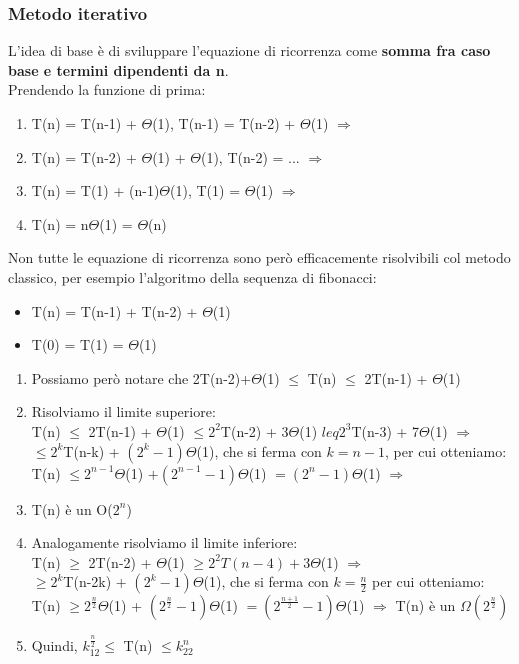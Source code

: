\documentclass{report}
\newcommand{\T}[1]{$\Theta$(#1)}
\begin{document}
        \subsubsection{Metodo iterativo}
            L'idea di base è di sviluppare l'equazione di ricorrenza come \textbf{somma fra caso base e termini dipendenti da n}. \\
            Prendendo la funzione di prima:
            \begin{enumerate}
                \item T(n) = T(n-1) + \T{1}, T(n-1) = T(n-2) + \T{1} $\Longrightarrow$
                \item T(n) = T(n-2) + \T{1} + \T{1}, T(n-2) = ... $\Longrightarrow$
                \item T(n) = T(1) + (n-1)\T{1}, T(1) = \T{1} $\Longrightarrow$
                \item T(n) = n\T{1} = \T{n}
            \end{enumerate}
            Non tutte le equazione di ricorrenza sono però efficacemente risolvibili col metodo classico, per esempio 
            l'algoritmo della sequenza di fibonacci:
            \begin{itemize}
                \item T(n) = T(n-1) + T(n-2) + \T{1}
                \item T(0) = T(1) = \T{1}
            \end{itemize}
            \begin{enumerate}
                \item Possiamo però notare che 2T(n-2)+\T{1} $\leq$ T(n) $\leq$ 2T(n-1) + \T{1}
                \item Risolviamo il limite superiore: \\
                    T(n) $\leq$ 2T(n-1) + \T{1} $\leq 2^2$T(n-2) + 3\T{1} $leq 2^3$T(n-3) + 7\T{1} $\Longrightarrow$ \\
                    $\leq 2^k$T(n-k) + $\left(2^k-1\right)$\T{1}, che si ferma con $k=n-1$, per cui otteniamo: \\
                    T(n) $\leq 2^{n-1}$\T{1} $+ \left(2^{n-1}-1\right)$\T{1} $ = \left(2^n-1\right)$\T{1} $\Longrightarrow$
                \item T(n) è un O($2^n$)
                \item Analogamente risolviamo il limite inferiore: \\
                    T(n) $\geq$ 2T(n-2) + \T{1} $\geq 2^2T(n-4) + 3$\T{1} $\Longrightarrow$ \\
                    $\geq 2^k$T(n-2k) + $\left(2^k-1\right)$\T{1}, che si ferma con $k=\frac{n}{2}$ per cui otteniamo: \\
                    T(n) $\geq 2^{\frac{n}{2}}$\T{1} + $\left(2^{\frac{n}{2}}-1\right)$\T{1} $ = \left(2^{\frac{n+1}{2}}-1\right)$\T{1} $\Longrightarrow$
                    T(n) è un $\Omega\left(2^{\frac{n}{2}}\right)$
                \item Quindi, $k_12^{\frac{n}{2}} \leq$ T(n) $\leq k_22^n$
            \end{enumerate}
\end{document}
